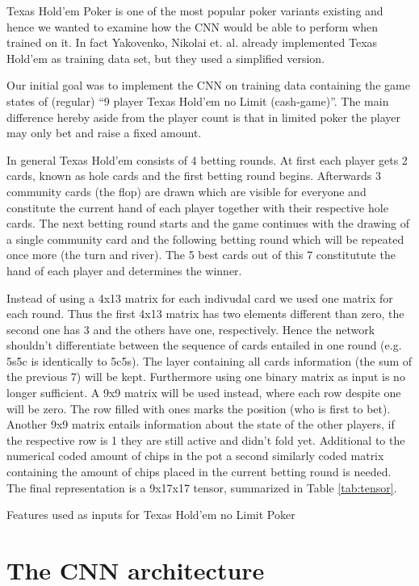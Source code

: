 \documentclass[]{report}
\begin{document}
Texas Hold'em Poker is one of the most popular poker variants existing
and hence we wanted to examine how the CNN would be able to perform
when trained on it. In fact Yakovenko, Nikolai et. al. already implemented
Texas Hold'em as training data set, but they used a simplified version.

Our initial goal was to implement the CNN on training data containing
the game states of (regular) ``9 player Texas Hold'em no Limit (cash-game)''.
The main difference hereby aside from the player count is that in
limited poker the player may only bet and raise a fixed amount.

In general Texas Hold'em consists of 4 betting rounds. At first each
player gets 2 cards, known as hole cards and the first betting round
begins. Afterwards 3 community cards (the flop) are drawn which are
visible for everyone and constitute the current hand of each player
together with their respective hole cards. The next betting round
starts and the game continues with the drawing of a single community
card and the following betting round which will be repeated once more
(the turn and river). The 5 best cards out of this 7 constitutute
the hand of each player and determines the winner.

Instead of using a 4x13 matrix for each indivudal card we used one
matrix for each round. Thus the first 4x13 matrix has two elements
different than zero, the second one has 3 and the others have one,
respectively. Hence the network shouldn't differentiate between the
sequence of cards entailed in one round (e.g. 5s5c is identically
to 5c5s). The layer containing all cards information (the sum of the
previous 7) will be kept. Furthermore using one binary matrix as input
is no longer sufficient. A 9x9 matrix will be used instead, where
each row despite one will be zero. The row filled with ones marks
the position (who is first to bet). Another 9x9 matrix entails information
about the state of the other players, if the respective row is 1 they
are still active and didn't fold yet. Additional to the numerical
coded amount of chips in the pot a second similarly coded matrix containing
the amount of chips placed in the current betting round is needed.
The final representation is a 9x17x17 tensor, summarized in Table
\ref{tab:tensor}. 
\begin{table}
\caption{Features used as inputs for Texas Hold'em no Limit Poker \label{tab:tensor}}
\end{table}

\section{The CNN architecture \label{see:CNN_arc} }
\end{document}
